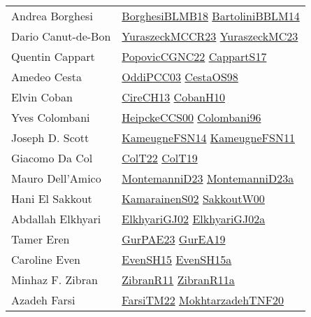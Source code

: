{\begin{longtable}{p{4cm}p{20cm}}
Andrea Borghesi & \href{articles/BorghesiBLMB18.pdf}{BorghesiBLMB18}\cite{BorghesiBLMB18} \href{papers/BartoliniBBLM14.pdf}{BartoliniBBLM14}\cite{BartoliniBBLM14} \\
Dario Canut{-}de{-}Bon & \href{articles/YuraszeckMCCR23.pdf}{YuraszeckMCCR23}\cite{YuraszeckMCCR23} \href{papers/YuraszeckMC23.pdf}{YuraszeckMC23}\cite{YuraszeckMC23} \\
Quentin Cappart & \href{papers/PopovicCGNC22.pdf}{PopovicCGNC22}\cite{PopovicCGNC22} \href{papers/CappartS17.pdf}{CappartS17}\cite{CappartS17} \\
Amedeo Cesta & \href{papers/OddiPCC03.pdf}{OddiPCC03}\cite{OddiPCC03} \href{papers/CestaOS98.pdf}{CestaOS98}\cite{CestaOS98} \\
Elvin Coban & \href{papers/CireCH13.pdf}{CireCH13}\cite{CireCH13} \href{papers/CobanH10.pdf}{CobanH10}\cite{CobanH10} \\
Yves Colombani & \href{articles/HeipckeCCS00.pdf}{HeipckeCCS00}\cite{HeipckeCCS00} \href{papers/Colombani96.pdf}{Colombani96}\cite{Colombani96} \\
Joseph D. Scott & \href{articles/KameugneFSN14.pdf}{KameugneFSN14}\cite{KameugneFSN14} \href{papers/KameugneFSN11.pdf}{KameugneFSN11}\cite{KameugneFSN11} \\
Giacomo Da Col & \href{articles/ColT22.pdf}{ColT22}\cite{ColT22} \href{papers/ColT19.pdf}{ColT19}\cite{ColT19} \\
Mauro Dell'Amico & \href{articles/MontemanniD23.pdf}{MontemanniD23}\cite{MontemanniD23} \href{articles/MontemanniD23a.pdf}{MontemanniD23a}\cite{MontemanniD23a} \\
Hani El Sakkout & \href{papers/KamarainenS02.pdf}{KamarainenS02}\cite{KamarainenS02} \href{articles/SakkoutW00.pdf}{SakkoutW00}\cite{SakkoutW00} \\
Abdallah Elkhyari & \href{papers/ElkhyariGJ02.pdf}{ElkhyariGJ02}\cite{ElkhyariGJ02} \href{papers/ElkhyariGJ02a.pdf}{ElkhyariGJ02a}\cite{ElkhyariGJ02a} \\
Tamer Eren & \href{articles/GurPAE23.pdf}{GurPAE23}\cite{GurPAE23} \href{articles/GurEA19.pdf}{GurEA19}\cite{GurEA19} \\
Caroline Even & \href{papers/EvenSH15.pdf}{EvenSH15}\cite{EvenSH15} \href{articles/EvenSH15a.pdf}{EvenSH15a}\cite{EvenSH15a} \\
Minhaz F. Zibran & \href{papers/ZibranR11.pdf}{ZibranR11}\cite{ZibranR11} \href{papers/ZibranR11a.pdf}{ZibranR11a}\cite{ZibranR11a} \\
Azadeh Farsi & \href{}{FarsiTM22}\cite{FarsiTM22} \href{}{MokhtarzadehTNF20}\cite{MokhtarzadehTNF20} \\

\end{longtable}}
